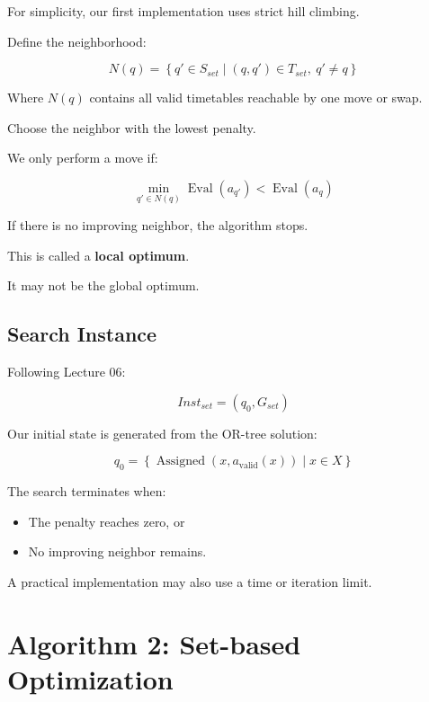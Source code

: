 \documentclass[11pt,letterpaper]{article}
\newcommand{\Assign}{\operatorname{Assigned}}
\newcommand{\Eval}{\operatorname{Eval}}
\newcommand{\Inst}{\mathit{Inst}}
\begin{document}
For simplicity, our first implementation
uses strict hill climbing.

Define the neighborhood:

\begin{equation}
\boxed{
N(q)=
\left\{
q'\in S_{set}
\mid
(q,q')\in T_{set},\ q'\neq q
\right\}
}
\end{equation}

Where $N(q)$ contains all valid timetables
reachable by one move or swap.

Choose the neighbor with the
lowest penalty.

We only perform a move if:

\begin{equation}
\boxed{
\min_{q'\in N(q)}
\Eval(a_{q'})
<
\Eval(a_q)
}
\end{equation}

If there is no improving neighbor,
the algorithm stops.

This is called a \textbf{local optimum}.

It may not be the global optimum.

\subsection{Search Instance}

Following Lecture 06:

\begin{equation}
\boxed{
\Inst_{set}=(q_0,G_{set})
}
\end{equation}

Our initial state is generated
from the OR-tree solution:

\begin{equation}
\boxed{
q_0=
\left\{
\Assign(x,a_{\mathrm{valid}}(x))
\mid
x\in X
\right\}
}
\end{equation}

The search terminates when:

\begin{itemize}
    \item The penalty reaches zero, or
    \item No improving neighbor remains.
\end{itemize}

A practical implementation may also
use a time or iteration limit.

\section{Algorithm 2: Set-based Optimization}
\end{document}

